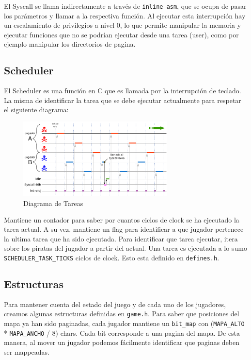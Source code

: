 El Syscall se llama indirectamente a través de \texttt{inline asm}, que se ocupa de pasar los parámetros y llamar a la respectiva función. Al ejecutar esta interrupción hay un escalamiento de privilegios a nivel 0, lo que permite manipular la memoria y ejecutar funciones que no se podrían ejecutar desde una tarea (user), como por ejemplo manipular los directorios de pagina.

\pagebreak

\subsection{Scheduler}

El Scheduler es una función en C que es llamada por la interrupción de teclado. La misma de identificar la tarea que se debe ejecutar actualmente para respetar el siguiente diagrama:

\begin{figure}[H]
  \centering
    \includegraphics[width=0.7\textwidth]{images/scheduler}
  \caption{Diagrama de Tareas}
\end{figure}

Mantiene un contador para saber por cuantos ciclos de clock se ha ejecutado la tarea actual. A su vez, mantiene un flag para identificar a que jugador pertenece la ultima tarea que ha sido ejecutada. Para identificar que tarea ejecutar, itera sobre los piratas del jugador a partir del actual. Una tarea es ejecutada a lo sumo \texttt{SCHEDULER\_TASK\_TICKS} ciclos de clock. Esto esta definido en \texttt{defines.h}.

\subsection{Estructuras}

Para mantener cuenta del estado del juego y de cada uno de los jugadores, creamos algunas estructuras definidas en \texttt{game.h}. Para saber que posiciones del mapa ya han sido paginadas, cada jugador mantiene un \texttt{bit\_map} con (\texttt{MAPA\_ALTO} * \texttt{MAPA\_ANCHO} / 8) chars. Cada bit corresponde a una pagina del mapa. De esta manera, al mover un jugador podemos fácilmente identificar que paginas deben ser mappeadas.

